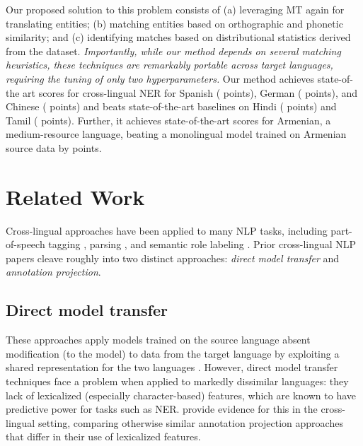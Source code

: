 \documentclass[11pt,a4paper]{article}
\begin{document}
Our proposed solution to this problem consists of
(a) leveraging MT again for translating entities;
(b) matching entities based on orthographic and phonetic similarity;
and (c) identifying matches based on distributional statistics derived from the dataset. 
\emph{Importantly, while our method depends on several matching heuristics,
these techniques are remarkably portable across target languages,
requiring the tuning of only two hyperparameters.}
Our method achieves state-of-the art  scores for cross-lingual NER 
for Spanish ( points), German ( points), and Chinese ( points) 
and beats state-of-the-art baselines on Hindi ( points) and Tamil ( points). 
Further, it achieves state-of-the-art  scores for Armenian, 
a medium-resource language, 
beating a monolingual model trained on Armenian source data by  points.





















%
 \section{Related Work}
\label{sec:related-work}

Cross-lingual approaches have been applied to 
many NLP tasks, including part-of-speech tagging 
\citep{yarowsky2001inducing, xi2005backoff, das2011unsupervised, tackstrom2013token}, 
parsing \citep{hwa2005bootstrapping, zeman2008cross, smith2009parser, ganchev2009dependency}, 
and semantic role labeling 
\citep{tonelli2008frame, pado2009cross, kozhevnikov2013cross, kozhevnikov2014cross}. 
Prior cross-lingual NLP papers cleave roughly into 
two distinct approaches: 
\emph{direct model transfer} and \emph{annotation projection}. 

\subsection{Direct model transfer}
These approaches apply models trained on the source language 
absent modification (to the model) to data from the target language
by exploiting a shared representation for the two languages 
\citep{tackstrom2012cross, bharadwaj2016phonologically, chaudhary2018adapting, kozhevnikov2014cross, ni2017weakly}.
However, direct model transfer techniques 
face a problem when applied to markedly dissimilar languages: 
they lack of lexicalized (especially character-based) features, 
which are known to have predictive power for tasks such as NER. 
\citet{xie2018neural} provide evidence 
for this in the cross-lingual setting,
comparing otherwise similar annotation projection approaches
that differ in their use of lexicalized features.
\end{document}

